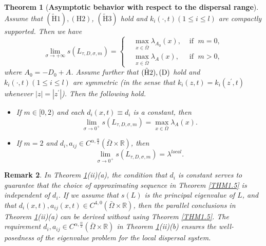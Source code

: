 \documentclass[11pt,reqno]{amsart}
\newtheorem{theorem}{Theorem}[section]
\newtheorem{remark}[theorem]{Remark}
\numberwithin{equation}{section}
\begin{document}
\begin{theorem}[\textbf{Asymptotic behavior with respect to the dispersal range}]\label{THM1.8}
Assume that $\mathrm{ (\tilde{H}1)},\mathrm{ ({H}2)}$, $\mathrm{ (\tilde{H}3)}$ hold and $k_{i}(\cdot,t) (1\leq i \leq l)$ are compactly supported. Then we have
\begin{equation*}
\lim_{\sigma\to +\infty} s(L_{\tau,D,\sigma,m}) =
\left\{
\begin{aligned}
& \max_{x\in\bar{\Omega}} \lambda_{A_{0}}(x), &\text{  if  }\;m=0,\\
& \max_{x\in\bar{\Omega}} \lambda_{A}(x), &\text{  if  }\; m>0,
\end{aligned}
\right.
\end{equation*}
where $A_{0} = -D_{0} + A$.
Assume further that ${ \rm (\tilde{H}2), (D)}$ hold and $k_{i}(\cdot,t) (1\leq i \leq l)$ are symmetric (in the sense that $k_{i}(z,t)=k_{i}(z^{\prime},t)$ whenever $|z|= |z^{\prime}|$).  Then the following hold.
\begin{itemize}
\item[(i)]  If $m\in [0,2)$ and each $d_{i}(x,t)\equiv d_{i}$ is a constant, then 
\begin{equation*}
\lim_{\sigma\to 0^{+}} s(L_{\tau,D,\sigma,m}) =
\max_{x\in\bar{\Omega}} \lambda_{A}(x).
\end{equation*} 

\item[(ii)] If $m=2$ and $d_{i}, a_{ij} \in C^{\alpha,\frac{\alpha}{2}}(\bar{\Omega} \times \mathbb{R})$, then \begin{equation*}
\lim_{\sigma\to 0^{+}} s(L_{\tau,D,\sigma,m}) = \lambda^{local}.
\end{equation*} 
\end{itemize}  
\end{theorem} 

\begin{remark}{\rm
In Theorem \ref{THM1.8}(ii)(a), the condition that $d_{i}$  is constant serves to guarantee that the choice of approximating sequence in Theorem \ref{THM1.5} is independent of  $d_{i}$.
If we assume that $s(L)$ is the principal eigenvalue of $L$, and that $d_{i}(x,t),a_{ij}(x,t)\in C^{4,0}(\bar{\Omega}\times \mathbb{R})$, then the parallel conclusions in Theorem \ref{THM1.8}(ii)(a) can be derived without using Theorem \ref{THM1.5}.
The requirement $d_{i},a_{ij}\in C^{\alpha,\frac{\alpha}{2}}(\bar{\Omega} \times \mathbb{R})$ in Theorem \ref{THM1.8}(ii)(b)  ensures the well-posedness of the eigenvalue problem for the local dispersal system.
}
\end{remark}
\end{document}

